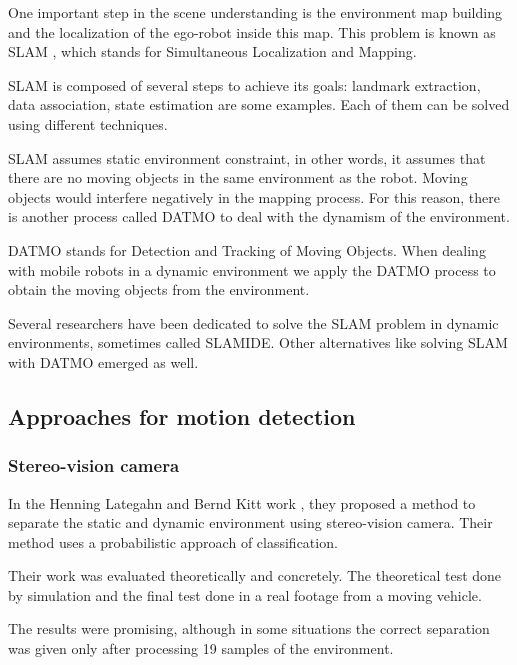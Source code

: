 One important step in the scene understanding is the environment map building and the localization of the ego-robot inside this map. This problem is known as SLAM \cite{Leonard2002Mobile, qadeerthesis}, which stands for Simultaneous Localization and  Mapping.

SLAM is composed of several steps to achieve its goals: landmark extraction, data association, state estimation are some examples. Each of them can be solved using different techniques.

SLAM assumes static environment constraint, in other words, it assumes that there are no moving objects in the same environment as the robot. Moving objects would interfere negatively in the mapping process. For this reason, there is another process called DATMO to deal with the dynamism of the environment.

DATMO stands for Detection and Tracking of Moving Objects. When dealing with mobile robots in a dynamic environment we apply the DATMO process to obtain the moving objects from the environment.

Several researchers have been dedicated to solve the SLAM problem in dynamic environments, sometimes called SLAMIDE\cite{bibbyrss07}. Other alternatives like solving SLAM with DATMO\cite{Wang02simultaneouslocalization} emerged as well.

\subsection{Approaches for motion detection}

\subsubsection{Stereo-vision camera}

In the Henning Lategahn and Bernd Kitt work \cite{DBLP:conf/ivs/LategahnGHKE11}, they proposed a method to separate the static and dynamic environment using stereo-vision camera. Their method uses a probabilistic approach of classification. %

Their work was evaluated theoretically and concretely. The theoretical test done by simulation and the final test done in a real footage from a moving vehicle.

The results were promising, although in some situations the correct separation was given only after processing 19 samples of the environment. 

